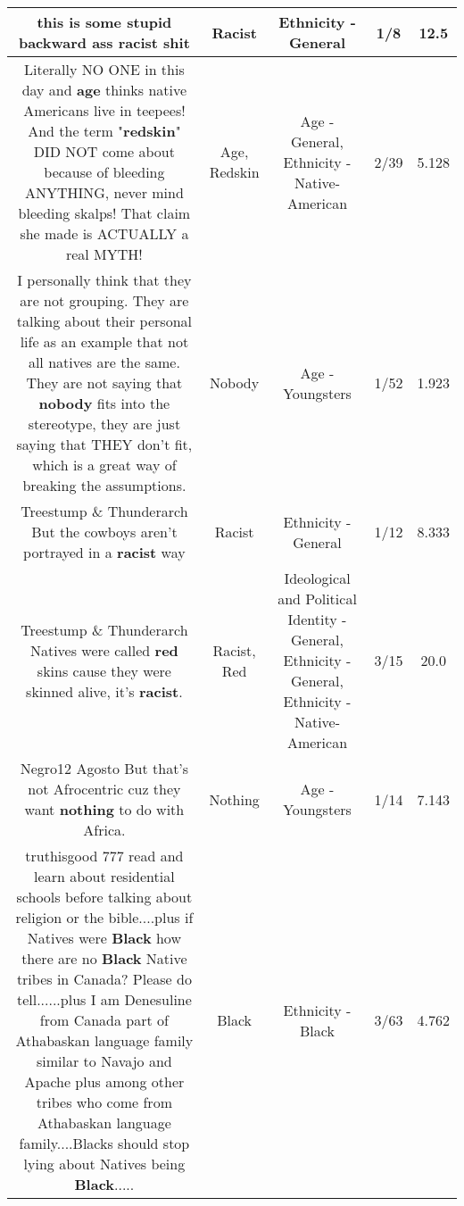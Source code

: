 \documentclass[11pt]{article}
\newlength\mylength
\begin{document}
\begin{center}
\begin{longtable}{|C{.65\mylength}|C{.30\mylength}|C{.12\mylength}|C{.12\mylength}|C{.12\mylength}|}
  \small this is some stupid backward ass \textbf{racist} shit\normalsize   & Racist & Ethnicity - General & 1/8 & 12.5 \\  \hline
  \small Literally NO ONE in this day and \textbf{age} thinks native Americans live in teepees! And the term "\textbf{redskin}" DID NOT come about because of bleeding ANYTHING, never mind bleeding skalps! That claim she made is ACTUALLY a real MYTH!\normalsize   & Age, Redskin & Age - General, Ethnicity - Native-American & 2/39 & 5.128 \\  \hline
  \small I personally think that they are not grouping. They are talking about their personal life as an example that not all natives are the same. They are not saying that \textbf{nobody} fits into the stereotype, they are just saying that THEY don't fit, which is a great way of breaking the assumptions.\normalsize   & Nobody & Age - Youngsters & 1/52 & 1.923 \\  \hline
  \small Treestump \& Thunderarch But the cowboys aren't portrayed in a \textbf{racist} way\normalsize   & Racist & Ethnicity - General & 1/12 & 8.333 \\  \hline
  \small Treestump \& Thunderarch Natives were called \textbf{r\textbf{ed}} skins cause they were skinned alive, it's \textbf{racist}.\normalsize   & Racist, Red &  Ideological and Political Identity - General, Ethnicity - General, Ethnicity - Native-American & 3/15 & 20.0 \\  \hline
  \small Negro12 Agosto But that's not Afrocentric cuz they want \textbf{nothing} to do with Africa.\normalsize   & Nothing & Age - Youngsters & 1/14 & 7.143 \\  \hline
  \small truthisgood 777 read and learn about residential schools before talking about religion or the bible....plus if Natives were \textbf{Black} how there are no \textbf{Black} Native tribes in Canada? Please do tell......plus I am Denesuline from Canada part of Athabaskan language family similar to Navajo and Apache plus among other tribes who come from Athabaskan language family....Blacks should stop lying about Natives being \textbf{Black}.....\normalsize   & Black & Ethnicity - Black & 3/63 & 4.762 \\  \hline

\end{longtable}
\end{center}
\end{document}
